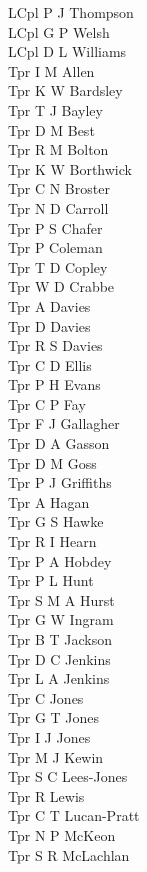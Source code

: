 \begin{multicols}{4}
  LCpl P J Thompson \\
  LCpl G P Welsh \\
  LCpl D L Williams \\
  Tpr I M Allen \\
  Tpr K W Bardsley \\
  Tpr T J Bayley \\
  Tpr D M Best \\
  Tpr R M Bolton \\
  Tpr K W Borthwick \\
  Tpr C N Broster \\
  Tpr N D Carroll \\
  Tpr P S Chafer \\
  Tpr P Coleman \\
  Tpr T D Copley \\
  Tpr W D Crabbe \\
  Tpr A Davies \\
  Tpr D Davies \\
  Tpr R S Davies \\
  Tpr C D Ellis \\
  Tpr P H Evans \\
  Tpr C P Fay \\
  Tpr F J Gallagher \\
  Tpr D A Gasson \\
  Tpr D M Goss \\
  Tpr P J Griffiths \\
  Tpr A Hagan \\
  Tpr G S Hawke \\
  Tpr R I Hearn \\
  Tpr P A Hobdey \\
  Tpr P L Hunt \\
  Tpr S M A Hurst \\
  Tpr G W Ingram \\
  Tpr B T Jackson \\
  Tpr D C Jenkins \\
  Tpr L A Jenkins \\
  Tpr C Jones \\
  Tpr G T Jones \\
  Tpr I J Jones \\
  Tpr M J Kewin \\
  Tpr S C Lees-Jones \\
  Tpr R Lewis \\
  Tpr C T Lucan-Pratt \\
  Tpr N P McKeon \\
  Tpr S R McLachlan \\

\end{multicols}
